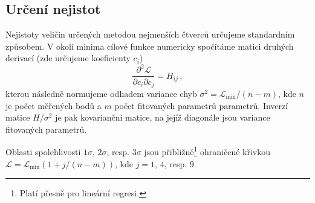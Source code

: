 \subsection*{Určení nejistot}

Nejistoty veličin určených metodou nejmenších čtverců určujeme standardním způsobem\cite{gelmanBayesianDataAnalysis2014}.
V okolí minima cílové funkce numericky spočítáme matici druhých derivací (zde určujeme koeficienty $c_i$)
\begin{equation}
    \frac{\partial^2 \mathcal{L}}{\partial c_i \partial c_j} = H_{ij} \,,
\end{equation}
kterou následně normujeme odhadem variance chyb $\sigma^2 = \mathcal{L}_\textrm{min}/(n-m)$, kde $n$ je počet měřených bodů a $m$ počet fitovaných parametrů parametrů.
Inverzí matice $H/\sigma^2$ je pak kovarianční matice, na jejíž diagonále jsou variance fitovaných parametrů.

Oblasti spolehlivosti $1\sigma$, $2\sigma$, resp. $3\sigma$ jsou přibližně\footnote{Platí přesně pro lineární regresi.} ohraničené křivkou $\mathcal{L}=\mathcal{L}_\textrm{min}(1+j/(n-m))$, kde $j=1$, $4$, resp. $9$.
